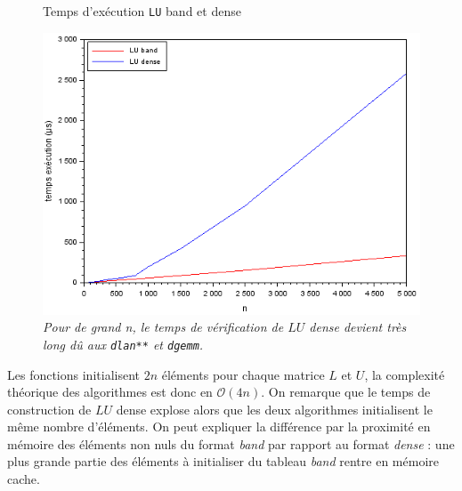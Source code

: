 \documentclass{article}
\begin{document}
\begin{figure}[H]
\caption{Temps d'exécution \texttt{LU} band et dense}
\centering
\includegraphics[scale=0.70]{time_lu_band_dense}
\caption*{\textit{Pour de grand n, le temps de vérification de $LU$ \textit{dense} devient très long dû aux \texttt{dlan**} et \texttt{dgemm}.}}
\end{figure}
Les fonctions initialisent $2n$ éléments pour chaque matrice $L$ et $U$, la complexité théorique des algorithmes est donc en \(\mathcal{O}(4n)\).
On remarque que le temps de construction de $LU$ dense explose alors que les deux algorithmes initialisent le même nombre d'éléments. On peut expliquer la différence par la proximité en mémoire des éléments non nuls du format \textit{band} par rapport au format \textit{dense} : une plus grande partie des éléments à initialiser du tableau \textit{band} rentre en mémoire cache.
\end{document}
